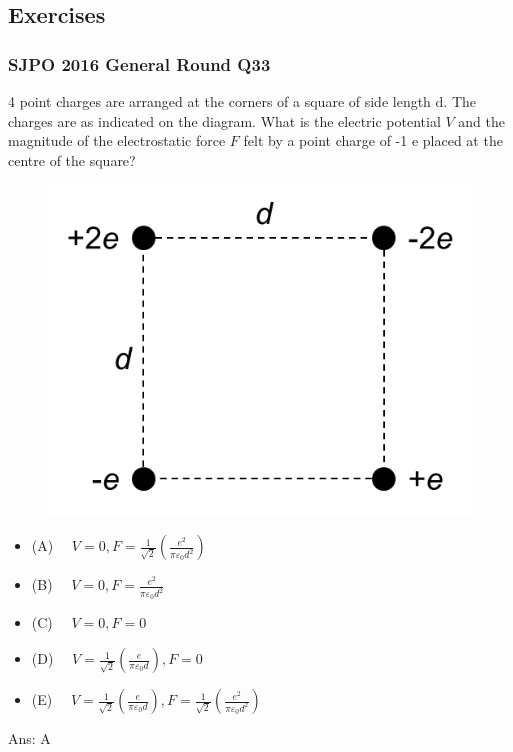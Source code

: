\documentclass{article}
\begin{document}
\subsection{Exercises}
\subsubsection{SJPO 2016 General Round Q33}
4 point charges are arranged at the corners of a square of side length $\mathrm{d}$. The charges are as indicated on the diagram. What is the electric potential $V$ and the magnitude of the electrostatic force $F$ felt by a point charge of -1 e placed at the centre of the square? \\[0pt]
\begin{figure} 
\includegraphics[width=\linewidth]{images/sjpo2016q33.png}
\end{figure}
\begin{itemize}
\item[] (A) $\quad V=0, F=\frac{1}{\sqrt{2}}\left(\frac{e^2}{\pi \varepsilon_0 d^2}\right)$
\item[] (B) $\quad V=0, F=\frac{e^2}{\pi \varepsilon_0 d^2}$
\item[] (C) $\quad V=0, F=0$
\item[] (D) $\quad V=\frac{1}{\sqrt{2}}\left(\frac{e}{\pi \varepsilon_0 d}\right), F=0$
\item[] (E) $\quad V=\frac{1}{\sqrt{2}}\left(\frac{e}{\pi \varepsilon_0 d}\right), F=\frac{1}{\sqrt{2}}\left(\frac{e^2}{\pi \varepsilon_0 d^2}\right)$
\end{itemize}
Ans: \ifpaper A \fi
\clearpage
\end{document}
